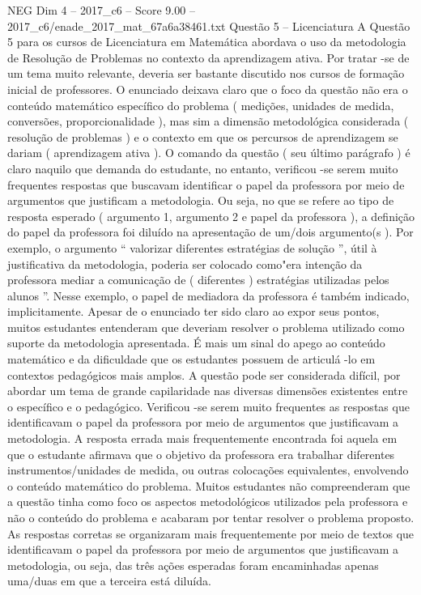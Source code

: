 \begin{textsample}{NEG Dim 4 – 2017\_c6 – Score 9.00 – 2017\_c6/enade\_2017\_mat\_67a6a38461.txt}
Questão 5 – Licenciatura A Questão 5 para os cursos de Licenciatura em Matemática abordava o uso da metodologia de Resolução de Problemas no contexto da aprendizagem ativa.
Por tratar -se de um tema muito relevante, deveria ser bastante discutido nos cursos de formação inicial de professores.
O enunciado deixava claro que o foco da questão não era o conteúdo matemático específico do problema ( medições, unidades de medida, conversões, proporcionalidade ), mas sim a dimensão metodológica considerada ( resolução de problemas ) e o contexto em que os percursos de aprendizagem se dariam ( aprendizagem ativa ).
O comando da questão ( seu último parágrafo ) é claro naquilo que demanda do estudante, no entanto, verificou -se serem muito frequentes respostas que buscavam identificar o papel da professora por meio de argumentos que justificam a metodologia.
Ou seja, no que se refere ao tipo de resposta esperado ( argumento 1, argumento 2 e papel da professora ), a definição do papel da professora foi diluído na apresentação de um/dois argumento(s ).
Por exemplo, o argumento “ valorizar diferentes estratégias de solução ”, útil à justificativa da metodologia, poderia ser colocado como"era intenção da professora mediar a comunicação de ( diferentes ) estratégias utilizadas pelos alunos ”.
Nesse exemplo, o papel de mediadora da professora é também indicado, implicitamente.
Apesar de o enunciado ter sido claro ao expor seus pontos, muitos estudantes entenderam que deveriam resolver o problema utilizado como suporte da metodologia apresentada.
É mais um sinal do apego ao conteúdo matemático e da dificuldade que os estudantes possuem de articulá -lo em contextos pedagógicos mais amplos.
A questão pode ser considerada difícil, por abordar um tema de grande capilaridade nas diversas dimensões existentes entre o específico e o pedagógico.
Verificou -se serem muito frequentes as respostas que identificavam o papel da professora por meio de argumentos que justificavam a metodologia.
A resposta errada mais frequentemente encontrada foi aquela em que o estudante afirmava que o objetivo da professora era trabalhar diferentes instrumentos/unidades de medida, ou outras colocações equivalentes, envolvendo o conteúdo matemático do problema.
Muitos estudantes não compreenderam que a questão tinha como foco os aspectos metodológicos utilizados pela professora e não o conteúdo do problema e acabaram por tentar resolver o problema proposto.
As respostas corretas se organizaram mais frequentemente por meio de textos que identificavam o papel da professora por meio de argumentos que justificavam a metodologia, ou seja, das três ações esperadas foram encaminhadas apenas uma/duas em que a terceira está diluída.

\end{textsample}
